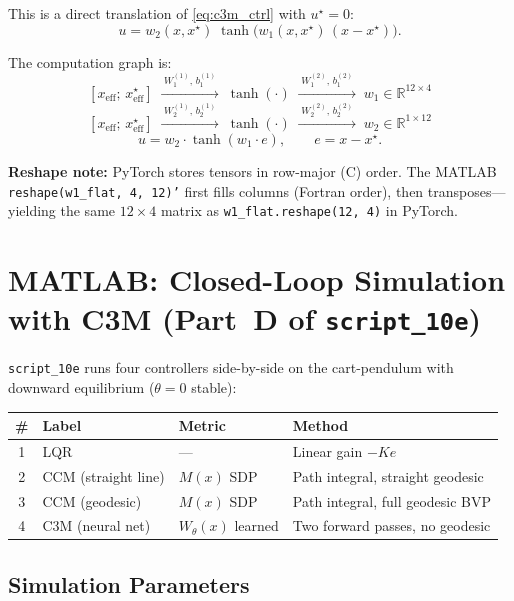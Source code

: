 \documentclass[11pt,a4paper]{article}
\begin{document}
\begin{codemath}
This is a direct translation of \eqref{eq:c3m_ctrl} with \(u^\star = 0\):
\[
u = w_2(x, x^\star)\;\tanh\!\bigl(w_1(x,x^\star)\,(x - x^\star)\bigr).
\]

The computation graph is:
\[
[x_{\mathrm{eff}};\, x^\star_{\mathrm{eff}}]
\;\xrightarrow{\;W_1^{(1)},\,b_1^{(1)}\;}\;
\tanh(\cdot)
\;\xrightarrow{\;W_1^{(2)},\,b_1^{(2)}\;}\;
w_1 \in \mathbb{R}^{12 \times 4}
\]
\[
[x_{\mathrm{eff}};\, x^\star_{\mathrm{eff}}]
\;\xrightarrow{\;W_2^{(1)},\,b_2^{(1)}\;}\;
\tanh(\cdot)
\;\xrightarrow{\;W_2^{(2)},\,b_2^{(2)}\;}\;
w_2 \in \mathbb{R}^{1 \times 12}
\]
\[
u = w_2 \cdot \tanh(w_1 \cdot e), \qquad e = x - x^\star.
\]

\textbf{Reshape note:} PyTorch stores tensors in row-major (C) order. The MATLAB \texttt{reshape(w1\_flat, 4, 12)'} first fills columns (Fortran order), then transposes—yielding the same \(12 \times 4\) matrix as \texttt{w1\_flat.reshape(12, 4)} in PyTorch.
\end{codemath}

\section{MATLAB: Closed-Loop Simulation with C3M (Part~D of \texttt{script\_10e})}
\label{sec:c3m_matlab_sim}

\texttt{script\_10e} runs four controllers side-by-side on the cart-pendulum with downward equilibrium (\(\theta = 0\) stable):

\begin{center}
\begin{tabular}{clll}
\toprule
\textbf{\#} & \textbf{Label} & \textbf{Metric} & \textbf{Method} \\
\midrule
1 & LQR                & ---             & Linear gain \(-K e\) \\
2 & CCM (straight line)& \(M(x)\) SDP    & Path integral, straight geodesic \\
3 & CCM (geodesic)     & \(M(x)\) SDP    & Path integral, full geodesic BVP \\
4 & C3M (neural net)   & \(W_\theta(x)\) learned & Two forward passes, no geodesic \\
\bottomrule
\end{tabular}
\end{center}

\subsection{Simulation Parameters}
\end{document}

